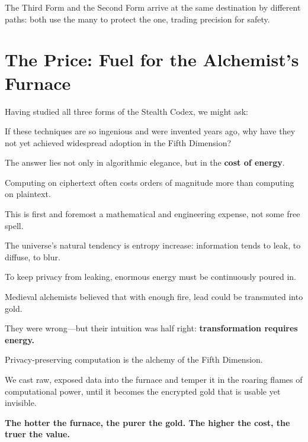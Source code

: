 The Third Form and the Second Form arrive at the same destination by different paths: both use the many to protect the one, trading precision for safety.


\section{The Price: Fuel for the Alchemist's Furnace}

Having studied all three forms of the Stealth Codex, we might ask:

If these techniques are so ingenious and were invented years ago, why have they not yet achieved widespread adoption in the Fifth Dimension?


The answer lies not only in algorithmic elegance, but in the \textbf{cost of energy}.

\vspace{1em}

Computing on ciphertext often costs orders of magnitude more than computing on plaintext.

This is first and foremost a mathematical and engineering expense, not some free spell.

The universe's natural tendency is entropy increase: information tends to leak, to diffuse, to blur.

To keep privacy from leaking, enormous energy must be continuously poured in.

\vspace{1em}

Medieval alchemists believed that with enough fire, lead could be transmuted into gold.

They were wrong---but their intuition was half right: \textbf{transformation requires energy.}

\vspace{1em}

Privacy-preserving computation is the alchemy of the Fifth Dimension.

We cast raw, exposed data into the furnace and temper it in the roaring flames of computational power, until it becomes the encrypted gold that is usable yet invisible.

\vspace{1em}

\textbf{The hotter the furnace, the purer the gold. The higher the cost, the truer the value.}

